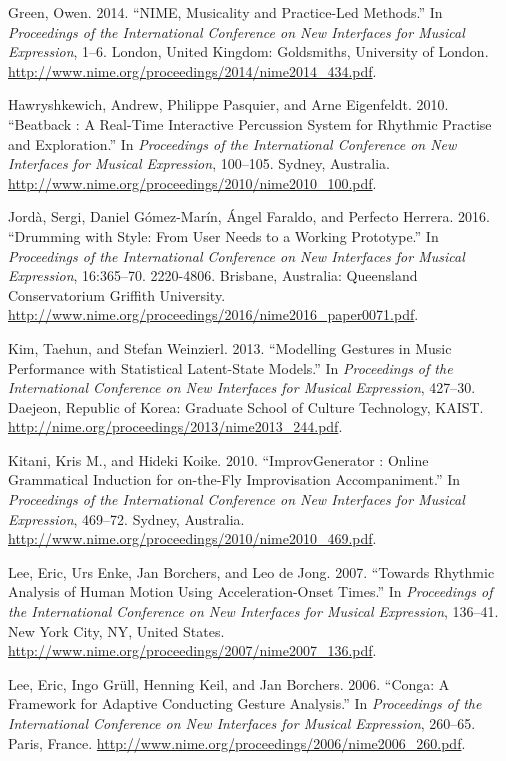 \documentclass[
]{article}
\newlength{\cslhangindent}
\newenvironment{cslreferences}%
  {\setlength{\parindent}{0pt}%
  \everypar{\setlength{\hangindent}{\cslhangindent}}\ignorespaces}%
  {\par}
\begin{document}
\begin{cslreferences}
\leavevmode\hypertarget{ref-ogreen2014}{}%
Green, Owen. 2014. ``NIME, Musicality and Practice-Led Methods.'' In
\emph{Proceedings of the International Conference on New Interfaces for
Musical Expression}, 1--6. London, United Kingdom: Goldsmiths,
University of London.
\url{http://www.nime.org/proceedings/2014/nime2014_434.pdf}.

\leavevmode\hypertarget{ref-Hawryshkewich2010}{}%
Hawryshkewich, Andrew, Philippe Pasquier, and Arne Eigenfeldt. 2010.
``Beatback : A Real-Time Interactive Percussion System for Rhythmic
Practise and Exploration.'' In \emph{Proceedings of the International
Conference on New Interfaces for Musical Expression}, 100--105. Sydney,
Australia. \url{http://www.nime.org/proceedings/2010/nime2010_100.pdf}.

\leavevmode\hypertarget{ref-Jordnicode2252016}{}%
Jordà, Sergi, Daniel Gómez-Marín, Ángel Faraldo, and Perfecto Herrera.
2016. ``Drumming with Style: From User Needs to a Working Prototype.''
In \emph{Proceedings of the International Conference on New Interfaces
for Musical Expression}, 16:365--70. 2220-4806. Brisbane, Australia:
Queensland Conservatorium Griffith University.
\url{http://www.nime.org/proceedings/2016/nime2016_paper0071.pdf}.

\leavevmode\hypertarget{ref-Kim2013}{}%
Kim, Taehun, and Stefan Weinzierl. 2013. ``Modelling Gestures in Music
Performance with Statistical Latent-State Models.'' In \emph{Proceedings
of the International Conference on New Interfaces for Musical
Expression}, 427--30. Daejeon, Republic of Korea: Graduate School of
Culture Technology, KAIST.
\url{http://nime.org/proceedings/2013/nime2013_244.pdf}.

\leavevmode\hypertarget{ref-Kitani2010}{}%
Kitani, Kris M., and Hideki Koike. 2010. ``ImprovGenerator : Online
Grammatical Induction for on-the-Fly Improvisation Accompaniment.'' In
\emph{Proceedings of the International Conference on New Interfaces for
Musical Expression}, 469--72. Sydney, Australia.
\url{http://www.nime.org/proceedings/2010/nime2010_469.pdf}.

\leavevmode\hypertarget{ref-Lee2007}{}%
Lee, Eric, Urs Enke, Jan Borchers, and Leo de Jong. 2007. ``Towards
Rhythmic Analysis of Human Motion Using Acceleration-Onset Times.'' In
\emph{Proceedings of the International Conference on New Interfaces for
Musical Expression}, 136--41. New York City, NY, United States.
\url{http://www.nime.org/proceedings/2007/nime2007_136.pdf}.

\leavevmode\hypertarget{ref-Lee2006}{}%
Lee, Eric, Ingo Grüll, Henning Keil, and Jan Borchers. 2006. ``Conga: A
Framework for Adaptive Conducting Gesture Analysis.'' In
\emph{Proceedings of the International Conference on New Interfaces for
Musical Expression}, 260--65. Paris, France.
\url{http://www.nime.org/proceedings/2006/nime2006_260.pdf}.


\end{cslreferences}
\end{document}
